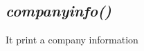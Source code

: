 \documentclass[12pt]{article}
\begin{document}
\subsection*{\it \bf  companyinfo() }
It print a company information

\subsection*{\it \bf   }
\subsection*{\it \bf   }



\pagebreak

\section*{}
\end{document}
